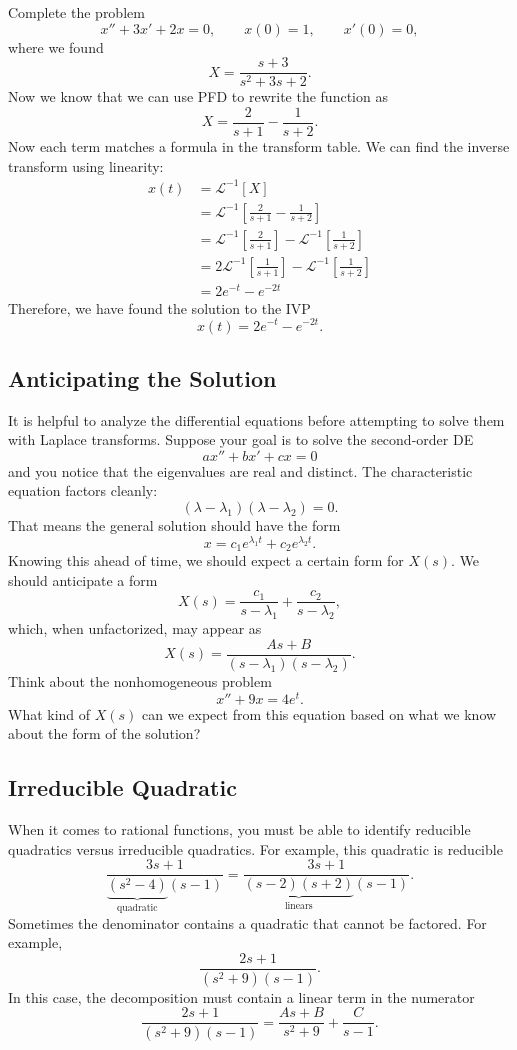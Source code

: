 \documentclass[10pt,letterpaper]{article}
\begin{document}
\begin{example}[4 (cont.)]{    
Complete the problem
\[
x''+3x'+2x=0, \qquad x(0)=1, \qquad x'(0)=0,
\]
where we found 
\[
X=\frac{s+3}{s^2+3s+2}.
\]
}
Now we know that we can use PFD to rewrite the function as 
\[
X=\frac{2}{s+1}-\frac{1}{s+2}.
\]
Now each term matches a formula in the transform table. We can find the inverse transform using linearity:
\begin{align*}
    x(t) &= \mathcal{L}^{-1}[X] \\
         &=\mathcal{L}^{-1}\left[\frac{2}{s+1}-\frac{1}{s+2}\right]\\
         &= \mathcal{L}^{-1}\left[\frac{2}{s+1}\right]-\mathcal{L}^{-1}\left[\frac{1}{s+2}\right]\\
         &= 2\mathcal{L}^{-1}\left[\frac{1}{s+1}\right]-\mathcal{L}^{-1}\left[\frac{1}{s+2}\right]\\
         &= 2e^{-t}-e^{-2t}
\end{align*}
Therefore, we have found the solution to the IVP 
\[
\boxed{
x(t)=2e^{-t}-e^{-2t}.
}
\]
\end{example}

\subsection{Anticipating the Solution}
It is helpful to analyze the differential equations before attempting to solve them with Laplace transforms. Suppose your goal is to solve the second-order DE
$$
ax''+bx'+cx=0
$$
and you notice that the eigenvalues are real and distinct. The characteristic equation factors cleanly: 
$$
    (\lambda-\lambda_1)(\lambda-\lambda_2)=0.
$$
That means the general solution should have the form
$$
    x = c_1e^{\lambda_1 t}+c_2e^{\lambda_2 t}.
$$
Knowing this ahead of time, we should expect a certain form for $X(s)$. We should anticipate a form 
$$
    X(s)=\frac{c_1}{s-\lambda_1} +\frac{c_2}{s-\lambda_2},
$$
which, when unfactorized, may appear as 
$$
    X(s) = \frac{As+B}{(s-\lambda_1)(s-\lambda_2)}.
$$
Think about the nonhomogeneous problem
$$
x''+9x=4e^{t}.
$$
What kind of $X(s)$ can we expect from this equation based on what we know about the form of the solution?





\subsection{Irreducible Quadratic}
When it comes to rational functions, you must be able to identify reducible quadratics versus irreducible quadratics. For example, this quadratic is reducible
$$
    \frac{3s+1}{\underbrace{(s^2-4)}_{\text{quadratic}}(s-1)} =   \frac{3s+1}{\underbrace{(s-2)(s+2)}_{\text{linears}}(s-1)}.
$$
Sometimes the denominator contains a quadratic that cannot be factored. For example, 
\[
\frac{2s+1}{(s^2+9)(s-1)}.
\]
In this case, the decomposition must contain a linear term in the numerator
\[
\frac{2s+1}{(s^2+9)(s-1)} =\frac{As+B}{s^2+9} + \frac{C}{s-1}.
\]
\end{document}

